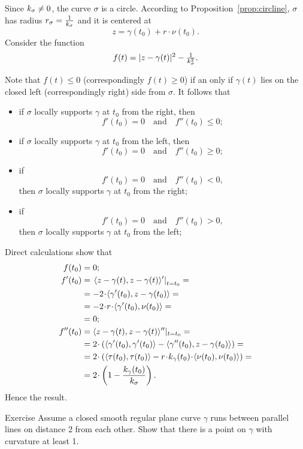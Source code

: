 Since $k_\sigma\ne0$, the curve $\sigma$ is a circle.
According to Proposition~\ref{prop:circline},
$\sigma$ has radius $r_\sigma=\tfrac1{k_\sigma}$ and it is centered at 
\[z=\gamma(t_0)+r\cdot\nu(t_0).\]
Consider the function 
\[f(t)=|z-\gamma(t)|^2-\tfrac1{k_\sigma^2}.\]

Note that $f(t)\le0$ (correspondingly $f(t)\ge0$) 
if an only if $\gamma(t)$ lies on the closed left (correspondingly right) side from $\sigma$.
It follows that 
\begin{itemize}
\item if $\sigma$ locally supports $\gamma$ at $t_0$ from the right, 
then
\[f'(t_0)=0\quad\text{and}\quad f''(t_0)\le 0;\]

\item if $\sigma$ locally supports $\gamma$ at $t_0$ from  the left, 
then 
\[f'(t_0)=0\quad\text{and}\quad f''(t_0)\ge 0;\]

\item if 
\[f'(t_0)=0\quad\text{and}\quad f''(t_0)< 0,\]
then $\sigma$ locally supports $\gamma$ at $t_0$ from  the right;

\item if 
\[f'(t_0)=0\quad\text{and}\quad f''(t_0)> 0,\] then $\sigma$ locally supports $\gamma$ at $t_0$ from  the left;
\end{itemize}

Direct calculations show that
\begin{align*}
f(t_0)&=0;
\\
f'(t_0)&=\left.\langle z-\gamma(t),z-\gamma(t) \rangle'\right|_{t=t_0}=
\\
&=-2\cdot \langle \gamma'(t_0),z-\gamma(t_0) \rangle=
\\&=-2\cdot r\cdot \langle \gamma'(t_0),\nu(t_0) \rangle=
\\
&=0;
\\
f''(t_0)&=\langle z-\gamma(t),z-\gamma(t) \rangle''|_{t=t_0}=
\\
&=2\cdot\left( \langle \gamma'(t_0),\gamma'(t_0) \rangle-\langle \gamma''(t_0),z-\gamma(t_0) \rangle \right)=
\\
&=2\cdot\left( \langle \tau(t_0),\tau(t_0) \rangle-r\cdot\kur_\gamma(t_0)\cdot \langle \nu(t_0),\nu(t_0) \rangle \right)=
\\
&=2\cdot\left(1- \frac{\kur_\gamma(t_0)}{\kur_\sigma}\right).
\end{align*}
Hence the result.\qeds


\begin{thm}{Exercise}\label{ex:between-parallels}
Assume a closed smooth regular plane curve $\gamma$ runs between parallel lines on distance 2 from each other.
Show that there is a point on $\gamma$ with curvature at least 1.
\end{thm}

